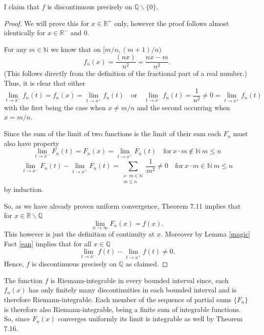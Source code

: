 \documentclass[12pt]{article}
\begin{document}
I claim that $f$ is discontinuous precisely on $\mathbb{Q} \backslash \{0\}$.
\begin{proof}
We will prove this for $x \in \mathbb{R}^+$ only, however the proof follows almost identically for $x \in \mathbb{R}^- $ and $0$.

For any $m \in \mathbb{N}$ we know that on $[m/n,(m+1)/n)$
\[f_n(x)=\frac{(n x)}{n^2} =  \frac{n x -m}{n^2}.\]
(This follows directly from the definition of the fractional part of a real number.)
Thus, it is clear that either
\[\lim_{t \to x^-}f_n(t) = f_n(x)=\lim_{t \to x^+}f_n(t) \quad \mathrm{or} \quad \lim_{t \to x^-}f_n(t) =\frac{1}{n^2}\neq 0= \lim_{t \to x^+}f_n(t)\]
with the first being the case when $x \neq m / n $ and the second occurring when $x = m/n$.

Since the sum of the limit of two functions is the limit of their sum each $F_n$ must also have property
\[\lim_{t \to x^-}F_n(t) = F_n(x)=\lim_{t \to x^+}F_n(t) \quad \mathrm{for\ }x\cdot m \notin \mathbb{N}\ m \leq n \] 
\begin{equation}\label{ean} \lim_{t \to x^-}F_n(t) - \lim_{t \to x^+}F_n(t) = \sum_{\substack{x\cdot m \in \mathbb{N} \\  m \leq n}} \frac{1}{m^2} \neq 0  \quad \mathrm{for\ }x\cdot m \in \mathbb{N}\ m \leq n \end{equation}
by induction.

So, as we have already proven uniform convergence, Theorem 7.11 implies that for $x \in \mathbb{R} \backslash \mathbb{Q}$
\[\lim_{n\to \infty}F_n(x) = f(x).\]
This however is just the definition of continuity at $x$. Moreover by Lemma \ref{magic} Fact \ref{ean} implies that for all $x \in \mathbb{Q}$ 
\[ \lim_{t \to x^-}f(t) - \lim_{t \to x^+}f(t) \neq 0.\]
Hence, $f$ is discontinuous precisely on $\mathbb{Q}$ as claimed. 
\end{proof}



The function $f$ is Riemann-integrable in every bounded interval since, each $f_n(x)$ has only finitely many discontinuities in each bounded interval and is therefore Riemann-integrable. Each member of the sequence of partial sums $\{F_n\}$ is therefore also Riemann-integrable, being a finite sum of integrable functions. So, since $F_n(x)$ converges uniformly its limit is integrable as well by Theorem 7.16.
\end{document}
